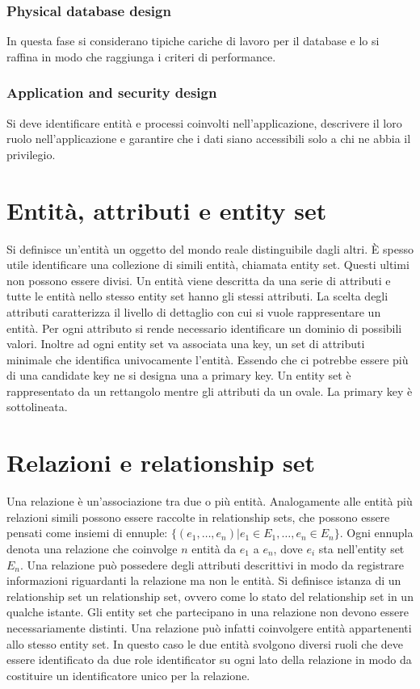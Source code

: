 \subsubsection{Physical database design}
In questa fase si considerano tipiche cariche di lavoro per il database e lo si raffina in modo che raggiunga i criteri di performance.
\subsubsection{Application and security design}
Si deve identificare entit\`a e processi coinvolti nell'applicazione, descrivere il loro ruolo nell'applicazione e garantire che i dati siano accessibili solo a chi ne abbia il privilegio. 
\section{Entit\`a, attributi e entity set}
Si definisce un'entit\`a un oggetto del mondo reale distinguibile dagli altri. \`E spesso utile identificare una collezione di simili entit\`a, chiamata entity set. Questi ultimi non possono essere divisi. Un entit\`a 
viene descritta da una serie di attributi e tutte le entit\`a nello stesso entity set hanno gli stessi attributi. La scelta degli attributi caratterizza il livello di dettaglio con cui si vuole rappresentare un entit\`a. Per ogni 
attributo si rende necessario identificare un dominio di possibili valori. Inoltre ad ogni entity set va associata una key, un set di attributi minimale che identifica univocamente l'entit\`a. Essendo che ci potrebbe 
essere pi\`u di una candidate key ne si designa una a primary key. Un entity set \`e rappresentato da un rettangolo mentre gli attributi da un ovale. La primary key \`e sottolineata. 
\section{Relazioni e relationship set}
Una relazione \`e un'associazione tra due o pi\`u entit\`a. Analogamente alle entit\`a pi\`u relazioni simili possono essere raccolte in relationship sets, che possono essere pensati come insiemi di ennuple: $
\{(e_1,\dots, e_n)|e_1\in E_1,\dots, e_n\in E_n\}$. Ogni ennupla denota una relazione che coinvolge $n$ entit\`a da $e_1$ a $e_n$, dove $e_i$ sta nell'entity set $E_n$. Una relazione pu\`o possedere degli 
attributi descrittivi in modo da registrare informazioni riguardanti la relazione ma non le entit\`a. Si definisce istanza di un relationship set un relationship set, ovvero come lo stato del relationship set in un 
qualche istante. Gli entity set che partecipano in una relazione non devono essere necessariamente distinti. Una relazione pu\`o infatti coinvolgere entit\`a appartenenti allo stesso entity set. In questo caso le 
due entit\`a svolgono diversi ruoli che deve essere identificato da due role identificator su ogni lato della relazione in modo da costituire un identificatore unico per la relazione. 

